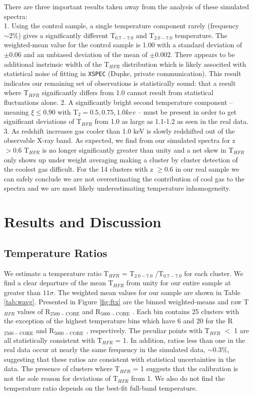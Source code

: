 \documentclass{emulateapj}
\newcommand{\tf}{T$_{HFR}$ }
\newcommand{\hard}{T$_{2.0-7.0}$ }
\newcommand{\full}{T$_{0.7-7.0}$ }
\newcommand{\rtwf}{R$_{2500-\text{CORE}}$ }
\newcommand{\rfif}{R$_{5000-\text{CORE}}$ }
\begin{document}
There are three important results taken away from the analysis of these
simulated spectra:\\
1. Using the control sample, a single temperature component rarely
(frequency $\sim 2\%$) gives a significantly different \full and \hard
temperature. The weighted-mean value for the control sample is 1.00
with a standard deviation of $\pm0.06$ and an unbiased deviation of
the mean of $\pm0.002$. There appears to be additional instrinsic
width of the \tf distribution which is likely associted with
statistical noise of fitting in {\tt XSPEC} (Dupke, private
communication). This result indicates our remaining set of
observations is statistically sound: that a result where \tf
significantly differs from 1.0 cannot result from statistical
fluctuations alone. 
2. A significantly bright second temperature component -- meaning $\xi
\leq 0.90$ with T$_2 = 0.5, 0.75, 1.0 kev$ -- must be present in order
to get significant deviations of \tf from 1.0 as large as 1.1-1.2 as
seen in the real data.
3. As redshift increases gas cooler than 1.0 keV is slowly redshifted
out of the observable X-ray band. As expected, we find from our
simulated spectra for z $> 0.6$ \tf is no longer significantly greater
than unity and a net skew in \tf only shows up under weight averaging
making a cluster by cluster detection of the coolest gas
difficult. For the 14 clusters with z $\geq 0.6$ in our real sample we
can safely conclude we are not overestimating the contribution of cool
gas to the spectra and we are most likely underestimating temperature
inhomogeneity.

\section{Results and Discussion} \label{sec:r&d}

\subsection{Temperature Ratios} \label{sec:tfresults}

We estimate a temperature ratio \tf = \hard/\full for each
cluster. We find a clear departure of the mean \tf from unity for
our entire sample at greater than $11\sigma$. The weighted mean values
for our sample are shown in Table \ref{tab:wavg}. Presented in Figure
\ref{fig:ftx} are the binned weighted-means and raw \tf values of
\rtwf and \rfif. Each bin contains 25 clusters with the exception of
the highest temperature bins which have 6 and 20 for the \rtwf and
\rfif, respectively. The peculiar points with \tf $<$ 1 are all
statistically consistent with \tf = 1. In addition, ratios less than
one in the real data occur at nearly the same frequency in the
simulated data, $\sim 0.3\%$, suggesting that these ratios are
consistent with statistical uncertainties in the data. The presence of
clusters where \tf = 1 suggests that the calibration is not the sole
reason for deviations of \tf from 1. We also do not find the
temperature ratio depends on the best-fit full-band temperature.
\end{document}
